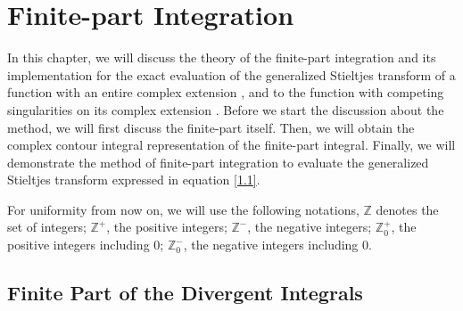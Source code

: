 \chapter{Finite-part Integration}
\label{ch_3}

 \hspace{\parindent} In this chapter, we will discuss the theory of the finite-part integration \cite{galapon2017problem} and its implementation for the exact evaluation of the generalized Stieltjes transform of a function with an entire complex extension \cite{tica2018finite, tica2019finite}, and to the function with competing singularities on its complex extension \cite{doi:10.1063/5.0038274}. Before we start the discussion about the method, we will first discuss the finite-part itself. Then, we will obtain the complex contour integral representation of the finite-part integral. Finally, we will demonstrate the method of finite-part integration to evaluate the generalized Stieltjes transform expressed in equation \eqref{1.1}.


For uniformity from now on, we will use the following notations, $\mathbb{Z}$ denotes the set of integers; $\mathbb{Z}^+$, the positive integers; $\mathbb{Z}^-$, the negative integers; $\mathbb{Z}^+_0$, the positive integers including $0$; $\mathbb{Z}^-_0$, the negative integers including $0$.
 
 
\section{Finite Part of the Divergent Integrals}

